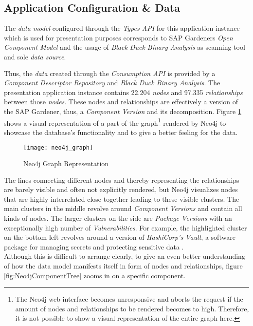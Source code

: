 \subsection{Application Configuration \& Data}
The \emph{data model} configured through the \emph{Types API} for this application instance which is used for presentation purposes corresponds to SAP Gardeners \emph{Open Component Model} and the usage of \emph{Black Duck Binary Analysis} as scanning tool and sole \emph{data source}.\par
Thus, the \emph{data} created through the \emph{Consumption API} is provided by a \emph{Component Descriptor Repository} and \emph{Black Duck Binary Analysis}. The presentation application instance contains 22.204 \emph{nodes} and 97.335 \emph{relationships} between those \emph{nodes}. These nodes and relationships are effectively a version of the SAP Gardener, thus, a \emph{Component Version} and its decomposition. Figure \ref{fig:Neo4jGraph} shows a visual representation of a part of the graph\footnote{The Neo4j web interface becomes unresponsive and aborts the request if the amount of nodes and relationships to be rendered becomes to high. Therefore, it is not possible to show a visual representation of the entire graph here.} rendered by Neo4j to showcase the database's functionality and to give a better feeling for the data.\par

\begin{figure}[H]
	\centering
	\texttt{[image: neo4j\_graph]}
	\caption[Neo4j Graph]{Neo4j Graph Representation }
	\label{fig:Neo4jGraph}
\end{figure}

The lines connecting different nodes and thereby representing the relationships are barely visible and often not explicitly rendered, but Neo4j visualizes nodes that are highly interrelated close together leading to these visible clusters. The main clusters in the middle revolve around \emph{Component Versions} and contain all kinds of nodes. The larger clusters on the side are \emph{Package Versions} with an exceptionally high number of \emph{Vulnerabilities}. For example, the highlighted cluster on the bottom left revolves around a version of \emph{HashiCorp's Vault}, a software package for managing secrets and protecting sensitive data \cite{vault}.\\

Although this is difficult to arrange clearly, to give an even better understanding of how the data model manifests itself in form of nodes and relationships, figure \ref{fig:Neo4jComponentTree} zooms in on a specific component.

